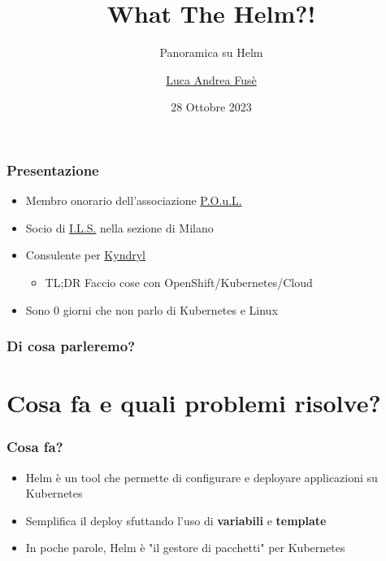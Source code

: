 \documentclass{beamer}
\title{What The Helm?!}
\subtitle{Panoramica su Helm}
\author{\href{https://www.linkedin.com/in/luca-af}{Luca Andrea Fusè}}
\date{28 Ottobre 2023}
\begin{document}
\renewcommand{\CancelColor}{\color{red}}

\begin{frame}
    \titlepage
\end{frame}
 
 \begin{frame}
     \frametitle{Presentazione}

    \begin{itemize}
        \item Membro onorario dell'associazione \href{https://www.poul.org}{P.O.u.L.}
        \item Socio di \href{https://www.ils.org}{I.L.S.} nella sezione di Milano
        \item Consulente per \href{https://www.kyndryl.com}{Kyndryl}
        \begin{itemize}\item TL;DR Faccio cose con OpenShift/Kubernetes/Cloud \end{itemize}
        \item Sono 0 giorni che non parlo di Kubernetes e Linux
    \end{itemize}
 \end{frame}
 
 \begin{frame}
   \frametitle{Di cosa parleremo?}
   \tableofcontents
   
  \end{frame}
  
\section{Cosa fa e quali problemi risolve?}
\begin{frame}
\frametitle{Cosa fa?}
 \begin{itemize}
    \item Helm è un tool che permette di configurare e deployare applicazioni su Kubernetes
    \item Semplifica il deploy sfuttando l'uso di \textbf{variabili} e \textbf{template}
    \item In poche parole, Helm è "il gestore di pacchetti" per Kubernetes
  \end{itemize}
\end{frame}
\end{document}
